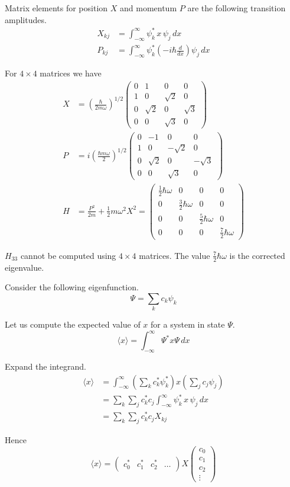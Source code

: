\documentclass[12pt]{article}
\begin{document}
\noindent
Matrix elements for position $X$ and momentum $P$ are the following transition amplitudes.
\begin{align*}
X_{kj}&=\int_{-\infty}^\infty \psi_k^*\,x\,\psi_j\,dx
\\[1ex]
P_{kj}&=\int_{-\infty}^\infty \psi_k^*\left(-i\hbar\frac{d}{dx}\right)\psi_j\,dx
\end{align*}

\noindent
For $4\times4$ matrices we have
\begin{align*}
X&=\left(\frac{\hbar}{2m\omega}\right)^{1/2}
\begin{pmatrix}
0 & 1 & 0 & 0
\\
1 & 0 & \sqrt{2} & 0
\\
0 & \sqrt{2} & 0 & \sqrt{3}
\\
0 & 0 & \sqrt{3} & 0
\end{pmatrix}
\\[1ex]
P&=i\left(\frac{\hbar m\omega}{2}\right)^{1/2}
\begin{pmatrix}
0 & -1 & 0 & 0
\\
1 & 0 & -\sqrt{2} & 0
\\
0 & \sqrt{2} & 0 & -\sqrt{3}
\\
0 & 0 & \sqrt{3} & 0
\end{pmatrix}
\\[1ex]
H&=\frac{P^2}{2m}+\frac{1}{2}m\omega^2 X^2
=\begin{pmatrix}
\tfrac{1}{2}\hbar\omega & 0 & 0 & 0
\\
0 & \tfrac{3}{2}\hbar\omega & 0 & 0
\\
0 & 0 & \tfrac{5}{2}\hbar\omega & 0
\\
0 & 0 & 0 & \tfrac{7}{2}\hbar\omega
\end{pmatrix}
\end{align*}

\noindent
$H_{33}$ cannot be computed using $4\times4$ matrices.
The value $\tfrac{7}{2}\hbar\omega$ is the corrected eigenvalue.

\bigskip
\noindent
Consider the following eigenfunction.
\begin{equation*}
\Psi=\sum_k c_k\psi_k
\end{equation*}

\noindent
Let us compute the expected value of $x$ for a system in state $\Psi$.
\begin{equation*}
\langle x\rangle=\int_{-\infty}^\infty \Psi^* x\Psi\,dx
\end{equation*}

\noindent
Expand the integrand.
\begin{align*}
\langle x\rangle
&=\int_{-\infty}^\infty
\left(\sum_kc_k^*\psi_k^*\right) x \left(\sum_j c_j\psi_j\right)
\\
&=\sum_k\sum_jc_k^*c_j\int_{-\infty}^\infty\psi_k^*\,x\,\psi_j\,dx
\\
&=\sum_k\sum_jc_k^*c_j X_{kj}
\end{align*}

\noindent
Hence
\begin{equation*}
\langle x\rangle=
\begin{pmatrix}c_0^* & c_1^* & c_2^* & \ldots\end{pmatrix}
X
\begin{pmatrix}c_0\\ c_1\\ c_2\\ \vdots\end{pmatrix}
\end{equation*}
\end{document}
